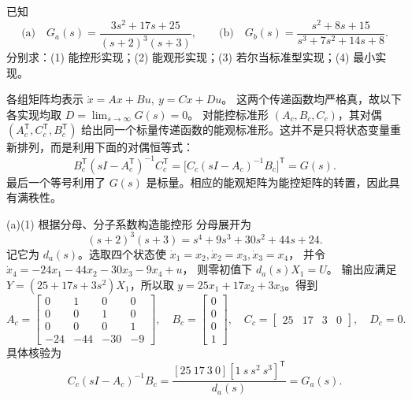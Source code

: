 \documentclass[11pt]{article}
\begin{document}
\begin{problem}[原题 5]
已知
\[
\text{(a)}\quad G_a(s)=\frac{3s^2+17s+25}{(s+2)^3(s+3)},\qquad
\text{(b)}\quad G_b(s)=\frac{s^2+8s+15}{s^3+7s^2+14s+8}.
\]
分别求：(1) 能控形实现；(2) 能观形实现；(3) 若尔当标准型实现；(4) 最小实现。
\end{problem}
\begin{solution}
各组矩阵均表示 $\dot x=Ax+Bu,\ y=Cx+Du$。
这两个传递函数均严格真，故以下各实现均取 $D=\lim_{s\to\infty}G(s)=0$。
对能控标准形 $(A_c,B_c,C_c)$，其对偶 $(A_c^{\mathsf T},C_c^{\mathsf T},B_c^{\mathsf T})$
给出同一个标量传递函数的能观标准形。这并不是只将状态变量重新排列，而是利用下面的对偶恒等式：
\[
B_c^{\mathsf T}(sI-A_c^{\mathsf T})^{-1}C_c^{\mathsf T}
=\bigl[C_c(sI-A_c)^{-1}B_c\bigr]^{\mathsf T}=G(s).
\]
最后一个等号利用了 $G(s)$ 是标量。相应的能观矩阵为能控矩阵的转置，因此具有满秩性。

\begin{proofstep}{(a)(1) 根据分母、分子系数构造能控形}
分母展开为
\[
(s+2)^3(s+3)=s^4+9s^3+30s^2+44s+24.
\]
记它为 $d_a(s)$。选取四个状态使
$\dot x_1=x_2,\dot x_2=x_3,\dot x_3=x_4$，
并令 $\dot x_4=-24x_1-44x_2-30x_3-9x_4+u$，
则零初值下 $d_a(s)X_1=U$。
输出应满足 $Y=(25+17s+3s^2)X_1$，所以取 $y=25x_1+17x_2+3x_3$。得到
\[
A_c=\begin{bmatrix}0&1&0&0\\0&0&1&0\\0&0&0&1\\-24&-44&-30&-9\end{bmatrix},\quad
B_c=\begin{bmatrix}0\\0\\0\\1\end{bmatrix},\quad
C_c=\begin{bmatrix}25&17&3&0\end{bmatrix},\quad D_c=0.
\]
具体核验为
\[
C_c(sI-A_c)^{-1}B_c
=\frac{[25\ 17\ 3\ 0][1\ s\ s^2\ s^3]^{\mathsf T}}{d_a(s)}
=G_a(s).
\]
\end{proofstep}


\end{solution}
\end{document}
